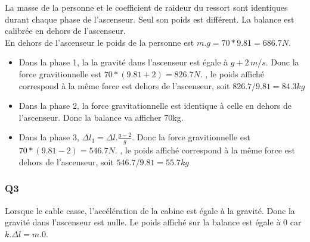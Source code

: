 \documentclass[]{book}
\theoremstyle{definition}
\begin{document}
La masse de la personne et le coefficient de raideur du ressort sont identiques durant chaque phase de l'ascenseur. Seul son poids est diff\'erent. La balance est calibr\'ee en dehors de l'ascenseur. \\
 En dehors de l'ascenseur le poids de la personne est $m.g = 70 * 9.81 = 686.7N$.

\begin{itemize}
\item Dans la phase 1, la la gravit\'e dans l'ascenseur est \'egale \`a $g + 2\, m/s$. Donc la force gravitionnelle est $70*(9.81+2) = 826.7N$. , le poids affich\'e correspond \`a la m\^eme force est dehors de l'ascenseur, soit $826.7/9.81 = 84.3kg$ 
\item Dans la phase 2, la force gravitationnelle est identique \`a celle en dehors de l'ascenseur. Donc la balance va afficher 70kg.
\item Dans la phase 3, $\Delta l_3 = \Delta l.\frac{g-2}{g}$. Donc la force gravitionnelle est $70*(9.81-2) = 546.7N$. , le poids affich\'e correspond \`a la m\^eme force est dehors de l'ascenseur, soit $546.7/9.81 = 55.7kg$ 
\end{itemize}

\subsubsection*{Q3}
Lorsque le cable casse, l'acc\'el\'eration de la cabine est \'egale \`a la gravit\'e. Donc la gravit\'e dans l'ascenseur est nulle. Le poids affich\'e sur la balance est \'egale \`a $0$ car $k.\Delta l = m.0$.
\end{document}
